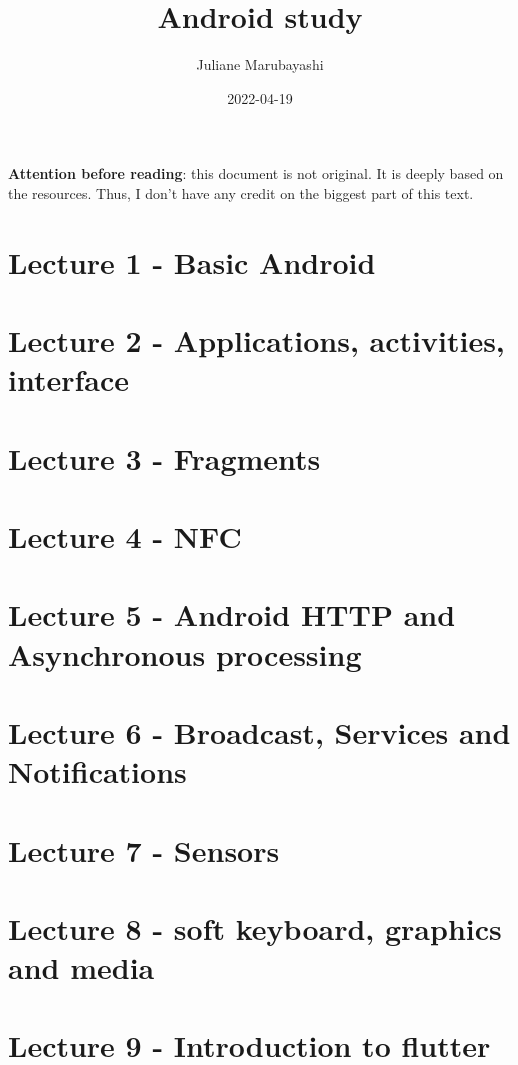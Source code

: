 \documentclass{article}
\title{Android study}
\author{Juliane Marubayashi}
\date{ 2022-04-19 }
\begin{document}
    \maketitle
    \newpage
    \tableofcontents
    \newpage
    \textbf{Attention before reading}: this document is not original. It is deeply based on the resources.
    Thus, I don't have any credit on the biggest part of this text. 
    \section{Lecture 1 - Basic Android}
    
    \section{Lecture 2 - Applications, activities, interface}
    
    \section{Lecture 3 - Fragments}
    
    \section{Lecture 4 - NFC}
    
    \newpage
    \section{Lecture 5 - Android HTTP and Asynchronous processing}
    
    \section{Lecture 6 - Broadcast, Services and Notifications}
    
    \section{Lecture 7 - Sensors}
    
    \section{Lecture 8 - soft keyboard, graphics and media}
    
    \section{Lecture 9 - Introduction to flutter}
    
\end{document}
